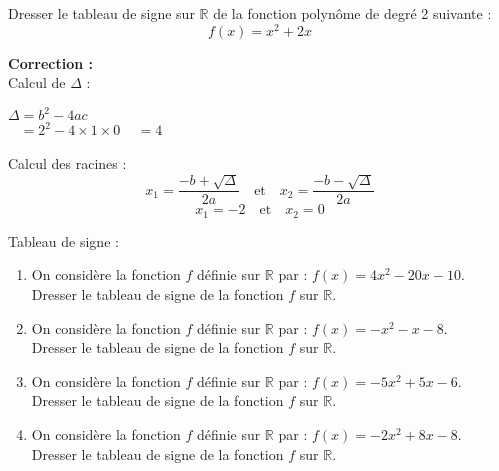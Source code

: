\documentclass[11pt]{article}
\begin{document}
\begin{exercice}

Dresser le tableau de signe sur $\mathbb{R}$ de la fonction polynôme de degré 2
suivante : 
$$ f(x) = x^2 + 2x$$

\textbf{Correction :} \\

Calcul de $\Delta$ :
\begin{center}
$\Delta = b^2 - 4ac$\\
$\phantom{\Delta} = 2^2 - 4\times 1 \times 0$ $\phantom{\Delta} = 4$
\end{center}

Calcul des racines : \\
$$x_1 =\dfrac{-b+\sqrt{\Delta}}{2a} \quad \text{et} \quad x_2 =\dfrac{-b-\sqrt{\Delta}}{2a}$$
$$x_1 =-2 \quad \text{et} \quad x_2 =0$$


Tableau de signe : \\
\begin{center}
\end{center}
\end{exercice}


\begin{exercice}
\begin{enumerate}[itemsep=1em]
	\item On considère la fonction $f$ définie sur $\mathbb{R}$ par : $f(x)=4x^2-20x-10$.\\Dresser le tableau de  signe de la fonction $f$ sur $\mathbb{R}$.
	\item On considère la fonction $f$ définie sur $\mathbb{R}$ par : $f(x)=-x^2-x-8$.\\Dresser le tableau de  signe de la fonction $f$ sur $\mathbb{R}$.
	\item On considère la fonction $f$ définie sur $\mathbb{R}$ par : $f(x)=-5x^2+5x-6$.\\Dresser le tableau de  signe de la fonction $f$ sur $\mathbb{R}$.
	\item On considère la fonction $f$ définie sur $\mathbb{R}$ par : $f(x)=-2x^2+8x-8$.\\Dresser le tableau de  signe de la fonction $f$ sur $\mathbb{R}$.
\end{enumerate}
\end{exercice}
\end{document}
